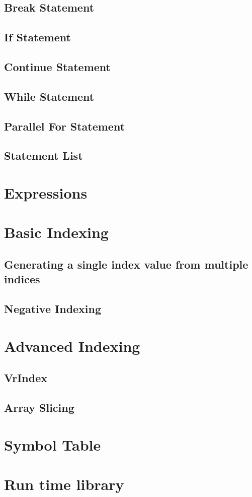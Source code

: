 \subsection{Break Statement}
\subsection{If Statement}
\subsection{Continue Statement}
\subsection{While Statement}
\subsection{Parallel For Statement}
\subsection{Statement List}
\section{Expressions}
\section{Basic Indexing}
\label{sec:indexing}
\subsection{ Generating a single index value from multiple indices}
\subsection{Negative Indexing}
\section{Advanced Indexing}
\subsection{VrIndex}
\label{subsec:vrindex}
\subsection{Array Slicing}
\section{Symbol Table}
\section{Run time library}
